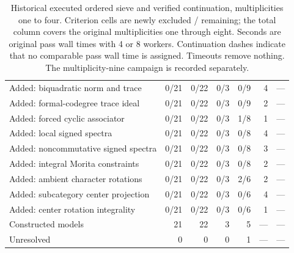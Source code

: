 \begin{table}[p]
\begin{tabular*}{\textwidth}{@{\extracolsep{\fill}}lrrrrrr@{}}
Added: biquadratic norm and trace & 0/21 & 0/22 & 0/3 & 0/9 & 4 & ---\\
Added: formal-codegree trace ideal & 0/21 & 0/22 & 0/3 & 0/9 & 2 & ---\\
Added: forced cyclic associator & 0/21 & 0/22 & 0/3 & 1/8 & 1 & ---\\
Added: local signed spectra & 0/21 & 0/22 & 0/3 & 0/8 & 4 & ---\\
Added: noncommutative signed spectra & 0/21 & 0/22 & 0/3 & 0/8 & 3 & ---\\
Added: integral Morita constraints & 0/21 & 0/22 & 0/3 & 0/8 & 2 & ---\\
Added: ambient character rotations & 0/21 & 0/22 & 0/3 & 2/6 & 2 & ---\\
Added: subcategory center projection & 0/21 & 0/22 & 0/3 & 0/6 & 4 & ---\\
Added: center rotation integrality & 0/21 & 0/22 & 0/3 & 0/6 & 1 & ---\\
\midrule
Constructed models & 21 & 22 & 3 & 5 & --- & ---\\
Unresolved & 0 & 0 & 0 & 1 & --- & ---\\
\bottomrule\end{tabular*}
\caption{Historical executed ordered sieve and verified continuation, multiplicities one to four. Criterion cells are newly excluded / remaining; the total column covers the original multiplicities one through eight. Seconds are original pass wall times with 4 or 8 workers. Continuation dashes indicate that no comparable pass wall time is assigned. Timeouts remove nothing. The multiplicity-nine campaign is recorded separately.}\label{tab:stages}
\end{table}
